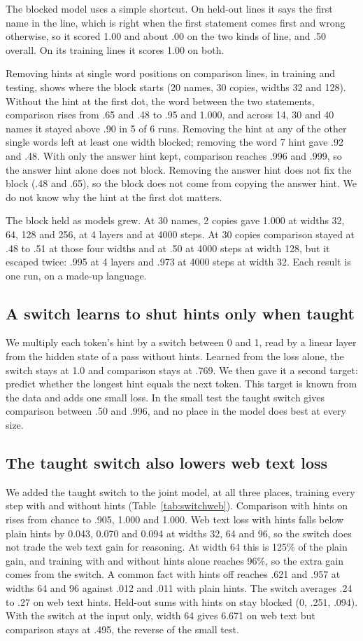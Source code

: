 \documentclass[11pt]{article}
\begin{document}
The blocked model uses a simple shortcut. On held-out lines it says the first name in the line, which is right when the first statement comes first and wrong otherwise, so it scored 1.00 and about .00 on the two kinds of line, and .50 overall. On its training lines it scores 1.00 on both.

Removing hints at single word positions on comparison lines, in training and testing, shows where the block starts (20 names, 30 copies, widths 32 and 128). Without the hint at the first dot, the word between the two statements, comparison rises from .65 and .48 to .95 and 1.000, and across 14, 30 and 40 names it stayed above .90 in 5 of 6 runs. Removing the hint at any of the other single words left at least one width blocked; removing the word 7 hint gave .92 and .48. With only the answer hint kept, comparison reaches .996 and .999, so the answer hint alone does not block. Removing the answer hint does not fix the block (.48 and .65), so the block does not come from copying the answer hint. We do not know why the hint at the first dot matters.

The block held as models grew. At 30 names, 2 copies gave 1.000 at widths 32, 64, 128 and 256, at 4 layers and at 4000 steps. At 30 copies comparison stayed at .48 to .51 at those four widths and at .50 at 4000 steps at width 128, but it escaped twice: .995 at 4 layers and .973 at 4000 steps at width 32. Each result is one run, on a made-up language.

\subsection{A switch learns to shut hints only when taught}
We multiply each token's hint by a switch between 0 and 1, read by a linear layer from the hidden state of a pass without hints. Learned from the loss alone, the switch stays at 1.0 and comparison stays at .769. We then gave it a second target: predict whether the longest hint equals the next token. This target is known from the data and adds one small loss. In the small test the taught switch gives comparison between .50 and .996, and no place in the model does best at every size.

\subsection{The taught switch also lowers web text loss}
We added the taught switch to the joint model, at all three places, training every step with and without hints (Table~\ref{tab:switchweb}). Comparison with hints on rises from chance to .905, 1.000 and 1.000. Web text loss with hints falls below plain hints by 0.043, 0.070 and 0.094 at widths 32, 64 and 96, so the switch does not trade the web text gain for reasoning. At width 64 this is 125\% of the plain gain, and training with and without hints alone reaches 96\%, so the extra gain comes from the switch. A common fact with hints off reaches .621 and .957 at widths 64 and 96 against .012 and .011 with plain hints. The switch averages .24 to .27 on web text hints. Held-out sums with hints on stay blocked (0, .251, .094). With the switch at the input only, width 64 gives 6.671 on web text but comparison stays at .495, the reverse of the small test.
\end{document}
